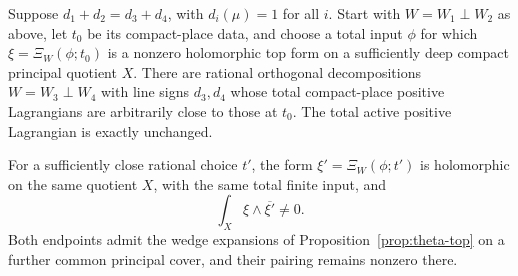 \begin{corollary}\label{cor:theta-switch-continuity}
Suppose \(d_1+d_2=d_3+d_4\), with \(d_i(\mu)=1\) for
all \(i\).  Start with \(W=W_1\perp W_2\) as above, let
\(t_0\) be its compact-place data, and choose a total input
\(\phi\) for which
\(\xi=\Xi_W(\phi;t_0)\) is a nonzero holomorphic top form
on a sufficiently deep compact principal quotient \(X\).
There are rational orthogonal decompositions
\(W=W_3\perp W_4\) with line signs \(d_3,d_4\) whose
total compact-place positive Lagrangians are arbitrarily close
to those at \(t_0\).  The total active positive Lagrangian is
exactly unchanged.

For a sufficiently close rational choice \(t'\), the form
\(\xi'=\Xi_W(\phi;t')\) is holomorphic on the same quotient
\(X\), with the same total finite input, and
\begin{equation}\label{eq:theta-nonzero-pairing}
 \int_X\xi\wedge\overline{\xi'}\ne0.
\end{equation}
Both endpoints admit the wedge expansions of
Proposition~\ref{prop:theta-top} on a further common principal
cover, and their pairing remains nonzero there.
\end{corollary}

